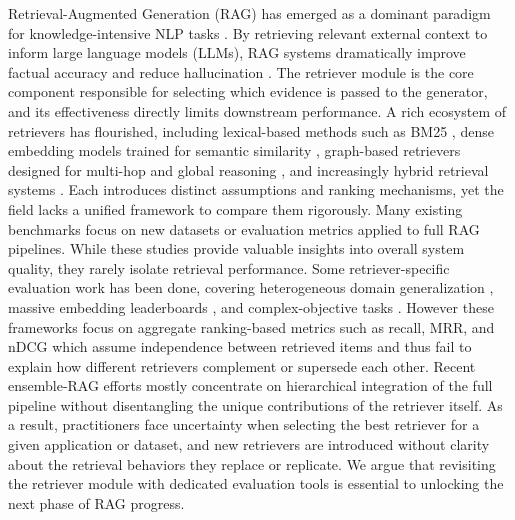\documentclass{article}
\theoremstyle{plain}
\theoremstyle{definition}
\theoremstyle{remark}
\begin{document}
Retrieval-Augmented Generation (RAG) has emerged as a dominant paradigm for knowledge-intensive NLP tasks \cite{lewis2020retrieval}. By retrieving relevant external context to inform large language models (LLMs), RAG systems dramatically improve factual accuracy and reduce hallucination \cite{shuster2021retrieval}. The retriever module is the core component responsible for selecting which evidence is passed to the generator, and its effectiveness directly limits downstream performance. A rich ecosystem of retrievers has flourished, including lexical-based methods such as BM25 \cite{robertson2009probabilistic}, dense embedding models trained for semantic similarity \citep{karpukhin2020dense}, graph-based retrievers designed for multi-hop and global reasoning \citep{edge2024local}, and increasingly hybrid retrieval systems \cite{sarmah2024hybridrag} . Each introduces distinct assumptions and ranking mechanisms, yet the field lacks a unified framework to compare them rigorously. %
Many existing benchmarks focus on new datasets or evaluation metrics applied to full RAG pipelines. While these studies provide valuable insights into overall system quality, they rarely isolate retrieval performance. 
Some retriever-specific evaluation work has been done, covering heterogeneous domain generalization \cite{thakur2021beir}, massive embedding leaderboards \cite{muennighoff2023mteb}, and complex-objective tasks \cite{wang2024birco}. However these frameworks focus on aggregate ranking-based metrics such as recall, MRR, and nDCG which assume independence between retrieved items and thus  fail to explain how different retrievers complement or supersede each other. 
Recent ensemble-RAG efforts mostly concentrate on hierarchical integration of the full pipeline without disentangling the unique contributions of the retriever itself. As a result, practitioners face uncertainty when selecting the best retriever for a given application or dataset, and new retrievers are introduced without clarity about the retrieval behaviors they replace or replicate. We argue that revisiting the retriever module with dedicated evaluation tools is essential to unlocking the next phase of RAG progress.

\end{document}

